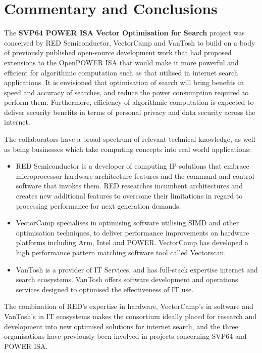 \chapter{Commentary and Conclusions}

The \textbf{\acrshort{SVP64} \acrshort{POWER} ISA Vector Optimisation for Search}
project was conceived by RED Semiconductor, VectorCamp and VanTosh to build on
a body of previously published open-source development work that had proposed
extensions to the OpenPOWER \acrfull{ISA} that would make it more powerful and
efficient for algorithmic computation such as that utilised in internet search
applications. It is envisioned that optimisation of search will bring benefits
in speed and accuracy of searches, and reduce the power consumption required to
perform them.
Furthermore, efficiency of algorithmic computation is expected to deliver
security benefits in terms of personal privacy and data security
across the internet.

The collaborators have a broad spectrum of relevant technical knowledge, as
well as being businesses which take computing concepts into real world
applications:
\begin{itemize}
  \item RED Semiconductor is a developer of computing IP solutions that embrace
  microprocessor hardware architecture features and the command-and-control
  software that invokes them. RED researches incumbent architectures and
  creates new additional features to overcome their limitations in regard to
  processing performance for next generation demands.
  \item VectorCamp specialises in optimising software utilising \acrshort{SIMD}
  and other optimisation techniques, to deliver performance improvements on
  hardware platforms including Arm, Intel and \acrshort{POWER}. VectorCamp has
  developed a high performance pattern matching software tool called Vectorscan.
  \item VanTosh is a provider of IT Services, and has full-stack expertise
  internet and search ecosystems. VanTosh offers software development and
  operations services designed to optimised the effectiveness of IT use.
\end{itemize}

The combination of RED’s expertise in hardware, VectorCamp’s in software and
VanTosh’s in IT ecosystems makes the consortium ideally placed for research and
development into new optimised solutions for internet search, and the three
organisations have previously been involved in projects concerning
\acrshort{SVP64} and \acrshort{POWER} ISA.

